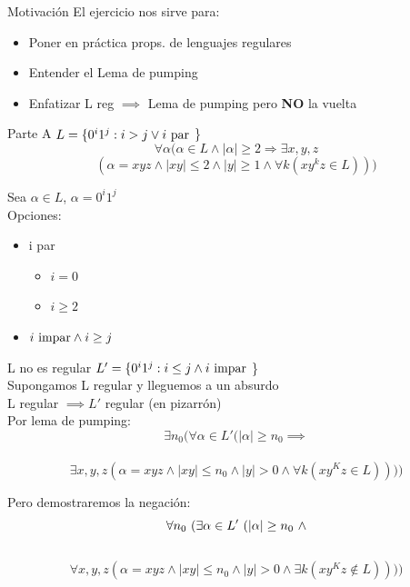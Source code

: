 \documentclass{beamer}
\begin{document}
\begin{frame}{Motivación}
  El ejercicio nos sirve para:
  \begin{itemize}
    \pause
  \item Poner en práctica props. de lenguajes regulares
    \pause
  \item Entender el Lema de pumping
    \pause
  \item Enfatizar L reg $\implies$ Lema de pumping pero \textbf{NO} la vuelta
  \end{itemize}
\end{frame}

\begin{frame}{Parte A}
   $L = \{0^i1^j : i > j \lor i \textnormal{ par}$ \}
$$ \forall \alpha (\alpha \in L \land |\alpha| \geq 2 \Rightarrow \exists x, y, z $$ 
  $$  (\alpha = xyz \land |xy| \leq 2 \land |y| \geq 1 \land \forall k (xy^kz \in L))) $$

  \pause
  Sea $\alpha \in L$, $\alpha = 0^i1^j$ \\
  \pause
  Opciones:
  \begin{itemize}
  \pause
  \item i par
    \begin{itemize}
      \pause
      \item $i = 0$
      \pause
      \item $i \geq 2$
      \pause
    \end{itemize}
  \item $i\textnormal{ impar} \land i \geq j$
  \end{itemize}
\end{frame}

\begin{frame}{L no es regular}
  $L' = \{0^i1^j : i \leq j \land i \textnormal{ impar}$ \} \\
  \vspace{1em}
  Supongamos L regular y lleguemos a un absurdo \\
  \vspace{1em}
  \pause
  L regular $\implies L'$ regular (en pizarrón) \\
  \pause
  Por lema de pumping: \\
  \pause
  $$\exists n_0 (\forall \alpha \in L'(|\alpha| \geq n_0 \implies$$ \\
  $$\exists x, y, z (\alpha = xyz \land |xy| \leq n_0 \land  |y| > 0 \land \forall k (xy^Kz \in L)))) $$

  \pause
  Pero demostraremos la negación:
  \pause
  $$\forall n_0 \textnormal{ } (\exists \alpha \in L'\textnormal{ } (|\alpha| \geq n_0 \textnormal{ } \land  $$ \\
  $$\forall x, y, z (\alpha = xyz \land |xy| \leq n_0 \land  |y| > 0 \land \exists k (xy^Kz \notin L)))) $$

\end{frame}
\end{document}
